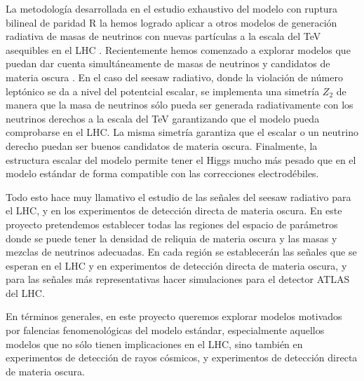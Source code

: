 \begin{darkmatter}
  La metodología desarrollada en el estudio exhaustivo del modelo con
  ruptura bilineal de paridad R la hemos logrado aplicar a otros
  modelos de generación radiativa de masas de neutrinos con nuevas
  partículas a la escala del TeV asequibles en el LHC
  \cite{Sierra:2008wj,AristizabalSierra:2006ri}. Recientemente hemos
  comenzado a explorar modelos que puedan dar cuenta simultáneamente
  de masas de neutrinos y candidatos de materia oscura
  \cite{Hirsch:2005ag,Choi:2010jt,Sierra:2008wj}. En el caso del
  seesaw radiativo, donde la violación de número leptónico se da a
  nivel del potentcial escalar, se implementa una simetría $Z_2$ de
  manera que la masa de neutrinos sólo pueda ser generada
  radiativamente con los neutrinos derechos a la escala del TeV
  garantizando que el modelo pueda comprobarse en el LHC. La misma
  simetría garantiza que el escalar o un neutrino derecho puedan ser
  buenos candidatos de materia oscura. Finalmente, la estructura
  escalar del modelo permite tener el Higgs mucho más pesado que en el
  modelo estándar de forma compatible con las correcciones
  electrodébiles.


\begin{proyecto}
  Todo esto hace muy llamativo el estudio de las señales del seesaw
  radiativo para el LHC, y en los experimentos de detección directa de
  materia oscura. En este proyecto pretendemos establecer todas las
  regiones del espacio de parámetros donde se puede tener la densidad
  de reliquia de materia oscura y las masas y mezclas de neutrinos
  adecuadas. En cada región se establecerán las señales que se esperan
  en el LHC y en experimentos de detección directa de materia oscura,
  y para las señales más representativas hacer simulaciones para el
  detector ATLAS del LHC.
\end{proyecto}
\end{darkmatter}


\begin{proyecto}
  En términos generales, en este proyecto queremos explorar modelos
  motivados por falencias fenomenológicas del modelo estándar,
  especialmente aquellos modelos que no sólo tienen implicaciones en
  el LHC, sino también en experimentos de detección de rayos cósmicos,
  y experimentos de detección directa de materia oscura.
\end{proyecto}

